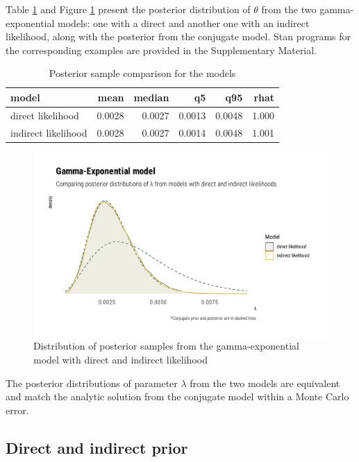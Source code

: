 \documentclass[ba]{imsart}
\numberwithin{equation}{section}
\theoremstyle{plain}
\begin{document}
Table \ref{tab:gexp-likelihood-tab} and Figure \ref{fig:gexp-likelihood-graphs} present the posterior distribution of \(\theta\) from the two gamma-exponential models: one with a direct and another one with an indirect likelihood, along with the posterior from the conjugate model. Stan programs for the corresponding examples are provided in the Supplementary Material.

\begin{table}[!h]

\caption{\label{tab:gexp-likelihood-tab}Posterior sample comparison for the models}
\centering
\begin{tabular}[t]{lrrrrr}
\toprule
model & mean & median & q5 & q95 & rhat\\
\midrule
direct likelihood & 0.0028 & 0.0027 & 0.0013 & 0.0048 & 1.000\\
indirect likelihood & 0.0028 & 0.0027 & 0.0014 & 0.0048 & 1.001\\
\bottomrule
\end{tabular}
\end{table}

\begin{figure}

{\centering \includegraphics[width=0.8\linewidth]{BA-submission_files/figure-latex/gexp-likelihood-graphs-1} 

}

\caption{Distribution of posterior samples from the gamma-exponential model with direct and indirect likelihood}\label{fig:gexp-likelihood-graphs}
\end{figure}

The posterior distributions of parameter \(\lambda\) from the two models are equivalent and match the analytic solution from the conjugate model within a Monte Carlo error.

\hypertarget{direct-and-indirect-prior}{%
\subsection{Direct and indirect prior}\label{direct-and-indirect-prior}}
\end{document}
